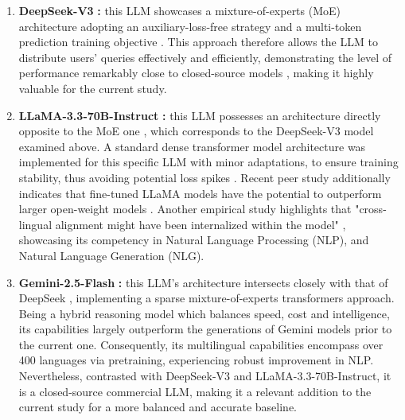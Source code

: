 \documentclass[10pt, twocolumn]{article}
\begin{document}
\begin{enumerate}
    
    \item \textbf{DeepSeek-V3} \cite{deepseekai2025deepseekv3technicalreport}\textbf{:} this LLM showcases a mixture-of-experts (MoE) architecture \cite{bandarkar2026multilingualroutingmixtureofexperts} adopting an auxiliary-loss-free strategy \cite{wang2024auxiliarylossfreeloadbalancingstrategy} and 
    a multi-token prediction training objective \cite{zhong2025understandingenhancingplanningcapability}. This approach therefore allows the LLM to distribute users' queries effectively and efficiently, demonstrating the level of performance remarkably close to closed-source models \cite{deepseekai2025deepseekv3technicalreport}, making it highly valuable for the current study.

    \item \textbf{LLaMA-3.3-70B-Instruct} \cite{grattafiori2024llama3herdmodels}\textbf{:} this LLM possesses an architecture  directly opposite to the MoE one \cite{bandarkar2026multilingualroutingmixtureofexperts}, which corresponds to the DeepSeek-V3 model examined above. A standard dense transformer model architecture \cite{vaswani2017attention} was implemented for this specific LLM with minor adaptations, to ensure training stability, thus avoiding potential loss spikes \cite{grattafiori2024llama3herdmodels}. Recent peer study additionally indicates that fine-tuned LLaMA models have the potential to outperform larger open-weight models \cite{syromiatnikov2025empoweringsmallermodelstuning}. Another empirical study highlights that "cross-lingual alignment might have been internalized within the model" \cite{zhao2024llamaenglishempiricalstudy}, showcasing its competency in Natural Language Processing (NLP), and Natural Language Generation (NLG). 

    \newpage
    \item \textbf{Gemini-2.5-Flash} \cite{comanici2025gemini25pushingfrontier}\textbf{:} this LLM's architecture intersects closely with that of DeepSeek \cite{deepseekai2025deepseekv3technicalreport}, implementing a sparse mixture-of-experts \cite{bandarkar2026multilingualroutingmixtureofexperts} transformers \cite{vaswani2017attention} approach. Being a hybrid reasoning model which balances speed, cost and intelligence, its capabilities largely outperform the generations of Gemini models prior to the current one. Consequently, its multilingual capabilities encompass over 400 languages via pretraining, experiencing robust improvement in NLP. Nevertheless, contrasted with DeepSeek-V3 and LLaMA-3.3-70B-Instruct, it is a closed-source commercial LLM, making it a relevant addition to the current study for a more balanced and accurate baseline.
    
\end{enumerate}
\end{document}
